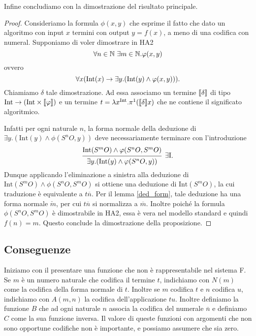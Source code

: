 \documentclass[]{marticle}
\begin{document}
Infine concludiamo con la dimostrazione del risultato principale.
\begin{proof}
    Consideriamo la formula $\phi(x,y)$ che esprime il fatto che dato un
    algoritmo con input $x$ termini con output $y=f(x)$, a meno di una codifica
    con numeral.  Supponiamo di voler dimostrare in HA2
    \[
        \forall n\in\mathbb{N}\ \exists m\in\mathbb{N} . \varphi(x,y)
    \]
    ovvero
    \[
        \forall x (\text{Int}(x)\rightarrow \exists y. (\text{Int}(y)\land \varphi(x,y))).
    \]
    Chiamiamo $\delta$ tale dimostrazione. Ad essa associamo un termine
    $\llbracket \delta \rrbracket$ di tipo $\text{Int}\rightarrow (\text{Int}\times\llbracket \varphi \rrbracket)$ e un termine $t =
    \lambda x^{\text{Int}}.\pi^1(\llbracket \delta \rrbracket x)$ che ne contiene il significato algoritmico.

    Infatti per ogni naturale $n$, la forma normale della deduzione di $\exists
    y.  (\text{Int}(y)\land \phi(S^nO,y))$ deve necessariamente terminare con
    l'introduzione
    \[
        \begin{prooftree}
            \hypo{\text{Int}(S^mO)\land \phi(S^nO,S^mO)} 
            \infer1[$\exists \text{I}$]{\exists y.(\text{Int}(y)\land
                \phi(S^nO,y))}
        \end{prooftree}.
    \]
    Dunque applicando l'eliminazione a sinistra alla deduzione di
    $\text{Int}(S^mO)\land \phi(S^nO,S^mO)$ si ottiene una deduzione di
    $\text{Int}(S^mO)$, la cui traduzione \`e equivalente a $t\overline{n}$. Per
    il lemma \ref{ded_form}, tale deduzione ha una forma normale $\check{m}$, per cui
    $t \overline{n}$ si normalizza a $\overline{m}$. Inoltre poich\'e la formula
    $\phi(S^nO, S^mO)$ \`e dimostrabile in HA2, essa \`e vera nel modello
    standard e quindi $f(n)=m$. Questo conclude la dimostrazione della
    proposizione.
\end{proof}

\subsection{Conseguenze}
Iniziamo con il presentare una funzione che non \`e rappresentabile nel sistema
F. Se $m$ \`e un numero naturale che codifica il termine $t$, indichiamo con
$N(m)$ come la codifica della forma normale di $t$. Inoltre se $m$ codifica $t$
e $n$ codifica $u$, indichiamo con $A(m, n)$ la codifica dell'applicazione $tu$.
Inoltre definiamo la funzione $B$ che ad ogni naturale $n$ associa la codifica
del numerale $\overline{n}$ e definiamo $C$ come la sua funzione inversa. Il
valore di queste funzioni con argomenti che non sono opportune codifiche non \`e
importante, e possiamo assumere che sia zero.
\end{document}
